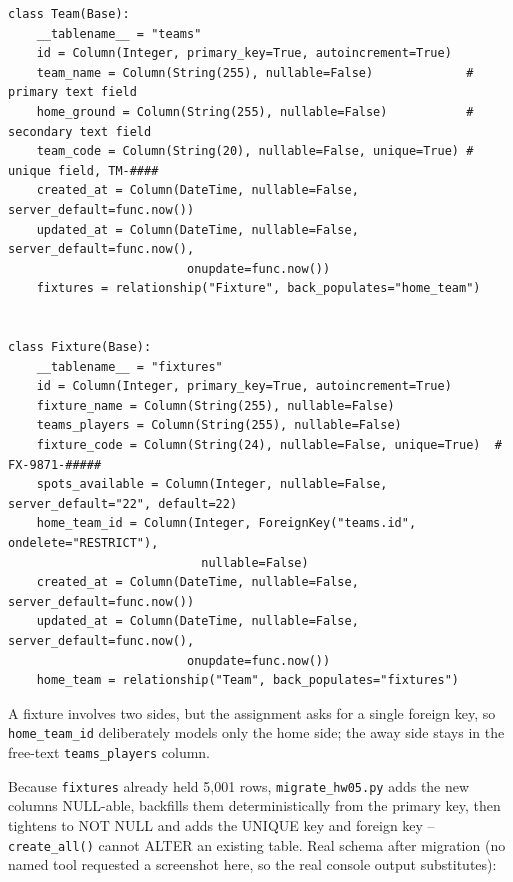 \documentclass[11pt]{article}
\begin{document}
\begin{lstlisting}
class Team(Base):
    __tablename__ = "teams"
    id = Column(Integer, primary_key=True, autoincrement=True)
    team_name = Column(String(255), nullable=False)             # primary text field
    home_ground = Column(String(255), nullable=False)           # secondary text field
    team_code = Column(String(20), nullable=False, unique=True) # unique field, TM-####
    created_at = Column(DateTime, nullable=False, server_default=func.now())
    updated_at = Column(DateTime, nullable=False, server_default=func.now(),
                         onupdate=func.now())
    fixtures = relationship("Fixture", back_populates="home_team")


class Fixture(Base):
    __tablename__ = "fixtures"
    id = Column(Integer, primary_key=True, autoincrement=True)
    fixture_name = Column(String(255), nullable=False)
    teams_players = Column(String(255), nullable=False)
    fixture_code = Column(String(24), nullable=False, unique=True)  # FX-9871-#####
    spots_available = Column(Integer, nullable=False, server_default="22", default=22)
    home_team_id = Column(Integer, ForeignKey("teams.id", ondelete="RESTRICT"),
                           nullable=False)
    created_at = Column(DateTime, nullable=False, server_default=func.now())
    updated_at = Column(DateTime, nullable=False, server_default=func.now(),
                         onupdate=func.now())
    home_team = relationship("Team", back_populates="fixtures")
\end{lstlisting}

A fixture involves two sides, but the assignment asks for a single foreign
key, so \verb|home_team_id| deliberately models only the home side; the
away side stays in the free-text \verb|teams_players| column.

Because \verb|fixtures| already held 5{,}001 rows, \verb|migrate_hw05.py| adds the
new columns NULL-able, backfills them deterministically from the primary
key, then tightens to NOT NULL and adds the UNIQUE key and foreign key --
\verb|create_all()| cannot ALTER an existing table. Real schema after migration
(no named tool requested a screenshot here, so the real console output
substitutes):
\end{document}
